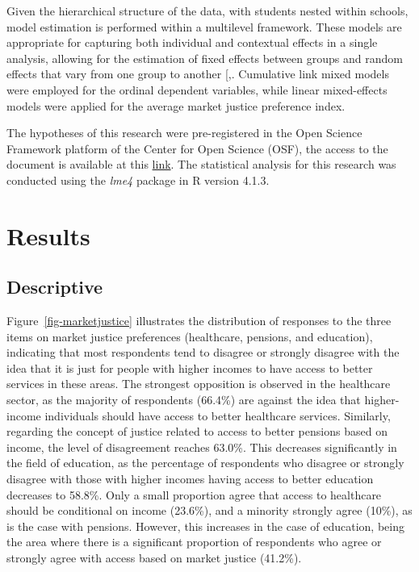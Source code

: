 \documentclass[
  12pt,
  letterpaper,
]{article}
\begin{document}
Given the hierarchical structure of the data, with students nested
within schools, model estimation is performed within a multilevel
framework. These models are appropriate for capturing both individual
and contextual effects in a single analysis, allowing for the estimation
of fixed effects between groups and random effects that vary from one
group to another
{[},\citeproc{ref-hox_multilevel_2010}{75}{]}.
Cumulative link mixed models were employed for the ordinal dependent
variables, while linear mixed-effects models were applied for the
average market justice preference index.

The hypotheses of this research were pre-registered in the Open Science
Framework platform of the Center for Open Science (OSF), the access to
the document is available at this
\href{https://doi.org/10.17605/OSF.IO/UFSDV}{link}. The statistical
analysis for this research was conducted using the \emph{lme4} package
in R version 4.1.3.

\section{Results}\label{results}

\subsection{Descriptive}\label{descriptive}

Figure~\ref{fig-marketjustice} illustrates the distribution of responses
to the three items on market justice preferences (healthcare, pensions,
and education), indicating that most respondents tend to disagree or
strongly disagree with the idea that it is just for people with higher
incomes to have access to better services in these areas. The strongest
opposition is observed in the healthcare sector, as the majority of
respondents (66.4\%) are against the idea that higher-income individuals
should have access to better healthcare services. Similarly, regarding
the concept of justice related to access to better pensions based on
income, the level of disagreement reaches 63.0\%. This decreases
significantly in the field of education, as the percentage of
respondents who disagree or strongly disagree with those with higher
incomes having access to better education decreases to 58.8\%. Only a
small proportion agree that access to healthcare should be conditional
on income (23.6\%), and a minority strongly agree (10\%), as is the case
with pensions. However, this increases in the case of education, being
the area where there is a significant proportion of respondents who
agree or strongly agree with access based on market justice (41.2\%).
\end{document}

